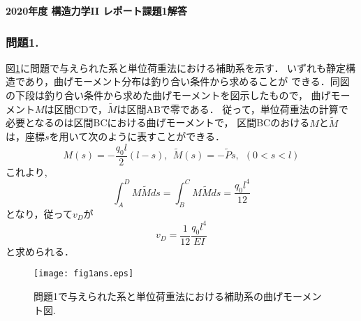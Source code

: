 \documentclass[10pt,a4j]{jarticle}
\newlength{\minitwocolumn}
\begin{document}
\def\Mmaru#1{{\ooalign{\hfil#1\/\hfil\crcr
\raise.167ex\hbox{\mathhexbox 20D}}}}


\newcommand{\fat}[1]{\mbox{\boldmath $#1$}}
\newcommand{\D}{\partial}

\newcommand{\w}{\omega}
\newcommand{\ga}{\alpha}
\newcommand{\gb}{\beta}
\newcommand{\gx}{\xi}
\newcommand{\gz}{\zeta}
\newcommand{\vhat}[1]{\hat{\fat{#1}}}
\newcommand{\spc}{\vspace{0.7\baselineskip}}
\newcommand{\halfspc}{\vspace{0.3\baselineskip}}

\newcommand{\twofig}[2]
 {
   \begin{figure}[h]
     \begin{minipage}[t]{\minitwocolumn}
         \begin{center}   #1
         \end{center}
     \end{minipage}
         \hspace{\columnsep}
     \begin{minipage}[t]{\minitwocolumn}
         \begin{center} #2
         \end{center}
     \end{minipage}
   \end{figure}
 }
\begin{center}
{\Large \bf 2020年度 構造力学II レポート課題1解答} \\
\end{center}
\subsubsection*{問題1.}
図\ref{fig:fig1}に問題で与えられた系と単位荷重法における補助系を示す．
いずれも静定構造であり，曲げモーメント分布は釣り合い条件から求めることが
できる．同図の下段は釣り合い条件から求めた曲げモーメントを図示したもので，
曲げモーメント$M$は区間CDで，$\tilde M$は区間ABで零である．
従って，単位荷重法の計算で必要となるのは区間BCにおける曲げモーメントで，
区間BCのおける$M$と$\tilde M$は，座標$s$を用いて次のように表すことができる．
\begin{equation}
	M(s)=-\frac{q_0l}{2}(l-s), \ \ \tilde M(s)=-\tilde P s, \ \ (0<s<l)
\end{equation}
これより,
\begin{equation}
	\int_A^D M\tilde Mds= \int_B^CM \tilde Mds=\frac{q_0l^4}{12}
\end{equation}
となり，従って$v_D$が
\begin{equation}
	v_D=\frac{1}{12}\frac{q_0l^4}{EI}
\end{equation}
と求められる．
\begin{figure}[h]
	\begin{center}
	\texttt{[image: fig1ans.eps]} 
	\end{center}
	\caption{問題1で与えられた系と単位荷重法における補助系の曲げモーメント図. } 
	\label{fig:fig1}
\end{figure}
\end{document}
